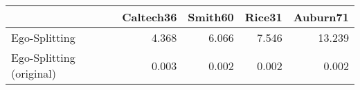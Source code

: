 \begin{tabular}{lrrrr}
\toprule
{} & Caltech36 & Smith60 & Rice31 & Auburn71 \\
\midrule
Ego-Splitting            &     4.368 &   6.066 &  7.546 &   13.239 \\
Ego-Splitting (original) &     0.003 &   0.002 &  0.002 &    0.002 \\
\bottomrule
\end{tabular}
